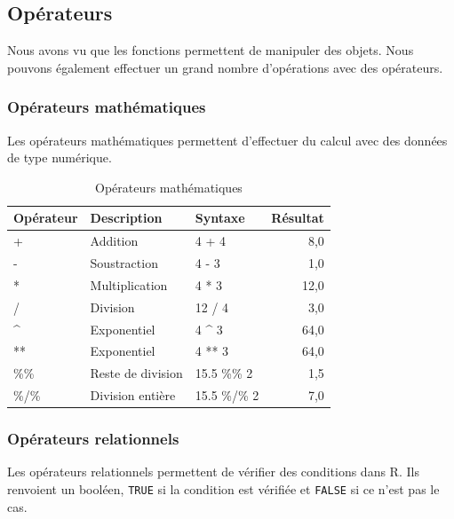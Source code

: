 \documentclass[
  11pt,
  french,
]{book}
\begin{document}
\hypertarget{sect0135}{%
\subsection{Opérateurs}\label{sect0135}}

Nous avons vu que les fonctions permettent de manipuler des objets. Nous pouvons également effectuer un grand nombre d'opérations avec des opérateurs.

\hypertarget{sect01351}{%
\subsubsection{Opérateurs mathématiques}\label{sect01351}}

Les opérateurs mathématiques permettent d'effectuer du calcul avec des données de type numérique.

\begin{table}

\caption{\label{tab:tableOperateurMath}Opérateurs mathématiques}
\centering
\fontsize{8}{10}\selectfont
\begin{tabular}[t]{lllr}
\toprule
Opérateur & Description & Syntaxe & Résultat\\
\midrule
+ & Addition & 4 + 4 & 8,0\\
- & Soustraction & 4 - 3 & 1,0\\
* & Multiplication & 4 * 3 & 12,0\\
/ & Division & 12 / 4 & 3,0\\
\textasciicircum{} & Exponentiel & 4 \textasciicircum{} 3 & 64,0\\
\addlinespace
** & Exponentiel & 4 ** 3 & 64,0\\
\%\% & Reste de division & 15.5 \%\% 2 & 1,5\\
\%/\% & Division entière & 15.5 \%/\% 2 & 7,0\\
\bottomrule
\end{tabular}
\end{table}

\hypertarget{sect01352}{%
\subsubsection{Opérateurs relationnels}\label{sect01352}}

Les opérateurs relationnels permettent de vérifier des conditions dans R. Ils renvoient un booléen, \texttt{TRUE} si la condition est vérifiée et \texttt{FALSE} si ce n'est pas le cas.
\end{document}
